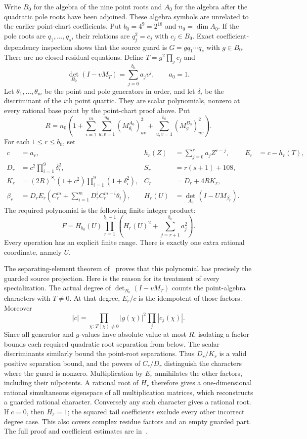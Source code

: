 \documentclass[11pt,a4paper]{article}
\begin{document}
Write $B_0$ for the algebra of the nine point roots and $A_0$
for the algebra after the quadratic pole roots have been adjoined.
These algebra symbols are unrelated to the earlier point-chart
coefficients. Put $b_0=4^9=2^{18}$ and $n_0=\dim A_0$.
If the pole roots are $q_1,\ldots,q_s$, their relations are
$q_j^2=c_j$ with $c_j\in B_0$. Exact coefficient-dependency
inspection shows that the source guard is
$G=gq_1\cdots q_s$ with $g\in B_0$. There are no closed
residual equations. Define $T=g^2\prod_jc_j$ and
\[
 \det_{B_0}(I-vM_T)=\sum_{j=0}^{b_0}a_jv^j,\qquad a_0=1.
\]
Let $\theta_1,\ldots,\theta_m$ be the point and pole generators
in order, and let $\delta_i$ be the discriminant of the $i$th
point quartic. They are scalar polynomials, nonzero at every
rational base point by the point-chart proof above. Put
\[
 R=n_0\left(1+\sum_{i=1}^m\sum_{u,v=1}^{n_0}
          (M_{\theta_i}^{A_0})_{uv}^2
        +\sum_{u,v=1}^{b_0}(M_g^{B_0})_{uv}^2\right).
\]
For each $1\le r\le b_0$, set
\begin{align*}
 c&=a_r,& h_r(Z)&=\sum_{j=0}^r a_jZ^{r-j},& E_r&=c-h_r(T),\\
 D_r&=c^2\prod_{i=1}^9\delta_i^2,&
 S_r&=r(s+1)+108,\\
 K_r&=(2R)^{S_r}(1+c^2)\prod_{i=1}^9(1+\delta_i^2),&
 C_r&=D_r+4RK_r,\\
 \beta_r&=D_rE_r\left(C_r^m+
                  \sum_{i=1}^mD_r^iC_r^{m-i}\theta_i\right),&
 H_r(U)&=\det_{A_0}(I-UM_{\beta_r}).
\end{align*}
The required polynomial is the following finite integer product:
\[
 F=H_{b_0}(U)\prod_{r=1}^{b_0-1}
             \left(H_r(U)^2+\sum_{j=r+1}^{b_0}a_j^2\right).
\]
Every operation has an explicit finite range. There is exactly
one extra rational coordinate, namely $U$.

The separating-element theorem of~\cite{Active} proves that
this polynomial has precisely the guarded source projection.
Here is the reason for its treatment of every specialization.
The actual degree of $\det_{B_0}(I-vM_T)$ counts the point-algebra
characters with $T\ne0$. At that degree, $E_r/c$ is the
idempotent of those factors. Moreover
\[
 |c|=\prod_{\chi:\,T(\chi)\ne0}
                     |g(\chi)|^2\prod_j|c_j(\chi)|.
\]
Since all generator and $g$-values have absolute value at most
$R$, isolating a factor bounds each required quadratic root
separation from below. The scalar discriminants similarly bound
the point-root separations. Thus $D_r/K_r$ is a valid positive
separation bound, and the powers of $C_r/D_r$ distinguish the
characters where the guard is nonzero. Multiplication by $E_r$
annihilates the other factors, including their nilpotents.
A rational root of $H_r$ therefore gives a one-dimensional
rational simultaneous eigenspace of all multiplication matrices,
which reconstructs a guarded rational character. Conversely
any such character gives a rational root. If $c=0$, then
$H_r=1$; the squared tail coefficients exclude every other
incorrect degree case. This also covers complex residue factors
and an empty guarded part. The full proof and coefficient
estimates are in~\cite{Active}.
\end{document}

